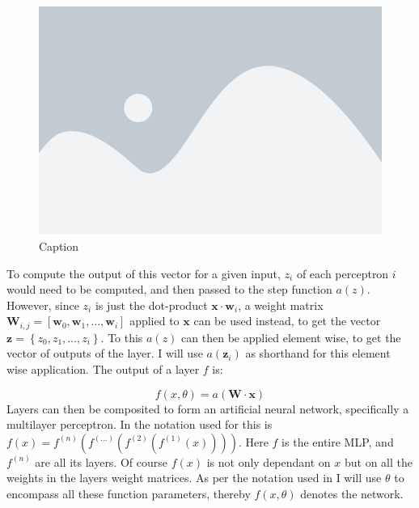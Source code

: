 \begin{figure}[H]
    \centering
    \includegraphics[width=0.6\linewidth]{figures/placeholder.png}
    \caption{Caption}
    \label{fig:my_label_1}
\end{figure}
\noindent
To compute the output of this vector for a given input, $z_i$ of each perceptron $i$ would need to be computed, and then passed to the step function $a(z)$. However, since $z_i$ is just the dot-product $\mathbf{x} \cdot \mathbf{w}_i$, a weight matrix $\mathbf{W}_{i, j} = \left[ \mathbf{w}_0, \mathbf{w}_1, \dots, \mathbf{w}_i \right]$ applied to $\mathbf{x}$ can be used instead, to get the vector $\mathbf{z} = \left\{ z_0, z_1, \dots, z_i \right\}$. To this $a(z)$ can then be applied element wise, to get the vector of outputs of the layer. I will use $a(\mathbf{z}_i)$ as shorthand for this element wise application. The output of a layer $f$ is:

\begin{equation}
    f(x, \theta) = a \left( \mathbf{W} \cdot \mathbf{x} \right)
\end{equation}
\noindent
Layers can then be composited to form an artificial neural network, specifically a multilayer perceptron. In \cite[p. 164]{Goodfellow-et-al-2016} the notation used for this is $f(x) = f^{(n)}(f^{(\dots)}(f^{(2)}(f^{(1)}(x))))$. Here $f$ is the entire MLP, and $f^{(n)}$ are all its layers. Of course $f(x)$ is not only dependant on $x$ but on all the weights in the layers weight matrices. As per the notation used in \cite{Goodfellow-et-al-2016} I will use $\theta$ to encompass all these function parameters, thereby $f(x, \theta)$ denotes the network. 

